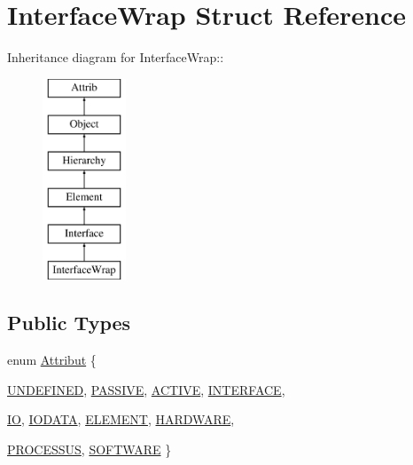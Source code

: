 \hypertarget{structInterfaceWrap}{
\section{InterfaceWrap Struct Reference}
\label{structInterfaceWrap}
}
Inheritance diagram for InterfaceWrap::\begin{figure}[H]
\begin{center}
\leavevmode
\includegraphics[height=6cm]{structInterfaceWrap}
\end{center}
\end{figure}
\subsection*{Public Types}
\begin{DoxyCompactItemize}
\item 
enum \hyperlink{classAttrib_a69e171d7cc6417835a5a306d3c764235}{Attribut} \{ \par
\hyperlink{classAttrib_a69e171d7cc6417835a5a306d3c764235a3a8da2ab97dda18aebab196fe4100531}{UNDEFINED}, 
\hyperlink{classAttrib_a69e171d7cc6417835a5a306d3c764235a2bfb2af57b87031d190a05fe25dd92ed}{PASSIVE}, 
\hyperlink{classAttrib_a69e171d7cc6417835a5a306d3c764235a3b1fec929c0370d1436f2f06e298fb0d}{ACTIVE}, 
\hyperlink{classAttrib_a69e171d7cc6417835a5a306d3c764235aa27c16b480a369ea4d18b07b2516bbc7}{INTERFACE}, 
\par
\hyperlink{classAttrib_a69e171d7cc6417835a5a306d3c764235a1420a5b8c0540b2af210b6975eded7f9}{IO}, 
\hyperlink{classAttrib_a69e171d7cc6417835a5a306d3c764235a0af3b0d0ac323c1704e6c69cf90add28}{IODATA}, 
\hyperlink{classAttrib_a69e171d7cc6417835a5a306d3c764235a7788bc5dd333fd8ce18562b269c9dab1}{ELEMENT}, 
\hyperlink{classAttrib_a69e171d7cc6417835a5a306d3c764235a61ceb22149f365f1780d18f9d1459423}{HARDWARE}, 
\par
\hyperlink{classAttrib_a69e171d7cc6417835a5a306d3c764235a75250e29692496e73effca2c0330977f}{PROCESSUS}, 
\hyperlink{classAttrib_a69e171d7cc6417835a5a306d3c764235a103a67cd0b8f07ef478fa45d4356e27b}{SOFTWARE}
 \}
\end{DoxyCompactItemize}
